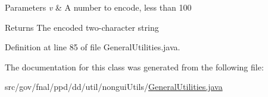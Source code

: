 \begin{DoxyParams}{Parameters}
{\em v} & A number to encode, less than 100 \\
\hline
\end{DoxyParams}
\begin{DoxyReturn}{Returns}
The encoded two-\/character string 
\end{DoxyReturn}


Definition at line 85 of file General\-Utilities.\-java.



The documentation for this class was generated from the following file\-:\begin{DoxyCompactItemize}
\item 
src/gov/fnal/ppd/dd/util/nongui\-Utils/\hyperlink{GeneralUtilities_8java}{General\-Utilities.\-java}\end{DoxyCompactItemize}
